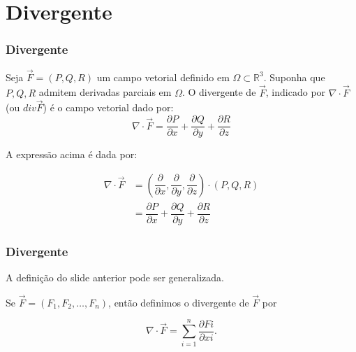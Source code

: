 \section{Divergente}
\begin{frame}
    \frametitle{Divergente}
    \begin{mydef}
        \justifying
        Seja $\vec{F}=(P,Q,R)$ um campo vetorial definido em $\Omega \subset \mathbb{R}^3$. Suponha que $P,Q,R$ admitem derivadas parciais em $\Omega$. O divergente de $\vec{F}$, indicado por $\nabla \cdot \vec{F}$ (ou $div \vec{F}$) é o campo vetorial dado por:
        \begin{equation*}
            \nabla \cdot \vec{F} = \dfrac{\partial P}{\partial x}+\dfrac{\partial Q}{\partial y}+\dfrac{\partial R}{\partial z}
        \end{equation*}
    \end{mydef}
    
    A expressão acima é dada por:
    
    \begin{align*}
        \nabla \cdot \vec{F} & = \left(\dfrac{\partial}{\partial x},\dfrac{\partial}{\partial y},\dfrac{\partial}{\partial z}\right) \cdot (P,Q,R) \\[3mm]
                             & = \dfrac{\partial P}{\partial x}+\dfrac{\partial Q}{\partial y}+\dfrac{\partial R}{\partial z}
    \end{align*}
    
\end{frame}

\begin{frame}
    \frametitle{Divergente}
    
    A definição do slide anterior pode ser generalizada. 
    \vspace{5mm}
    
    Se $\vec{F}=(F_1, F_2, \ldots, F_n)$, então definimos o divergente de $\vec{F}$ por
    \vspace{3mm}
    
    \begin{equation*}
        \nabla \cdot \vec{F} = \sum\limits_{i=1}^{n} \dfrac{\partial Fi}{\partial xi}.
    \end{equation*}
\end{frame}

